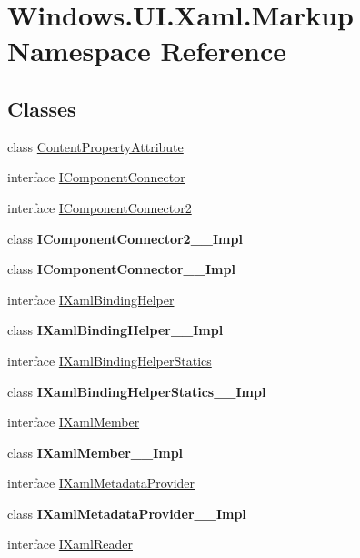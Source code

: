 \hypertarget{namespace_windows_1_1_u_i_1_1_xaml_1_1_markup}{}\section{Windows.\+U\+I.\+Xaml.\+Markup Namespace Reference}
\label{namespace_windows_1_1_u_i_1_1_xaml_1_1_markup}
\subsection*{Classes}
\begin{DoxyCompactItemize}
\item 
class \hyperlink{class_windows_1_1_u_i_1_1_xaml_1_1_markup_1_1_content_property_attribute}{Content\+Property\+Attribute}
\item 
interface \hyperlink{interface_windows_1_1_u_i_1_1_xaml_1_1_markup_1_1_i_component_connector}{I\+Component\+Connector}
\item 
interface \hyperlink{interface_windows_1_1_u_i_1_1_xaml_1_1_markup_1_1_i_component_connector2}{I\+Component\+Connector2}
\item 
class {\bfseries I\+Component\+Connector2\+\_\+\+\_\+\+Impl}
\item 
class {\bfseries I\+Component\+Connector\+\_\+\+\_\+\+Impl}
\item 
interface \hyperlink{interface_windows_1_1_u_i_1_1_xaml_1_1_markup_1_1_i_xaml_binding_helper}{I\+Xaml\+Binding\+Helper}
\item 
class {\bfseries I\+Xaml\+Binding\+Helper\+\_\+\+\_\+\+Impl}
\item 
interface \hyperlink{interface_windows_1_1_u_i_1_1_xaml_1_1_markup_1_1_i_xaml_binding_helper_statics}{I\+Xaml\+Binding\+Helper\+Statics}
\item 
class {\bfseries I\+Xaml\+Binding\+Helper\+Statics\+\_\+\+\_\+\+Impl}
\item 
interface \hyperlink{interface_windows_1_1_u_i_1_1_xaml_1_1_markup_1_1_i_xaml_member}{I\+Xaml\+Member}
\item 
class {\bfseries I\+Xaml\+Member\+\_\+\+\_\+\+Impl}
\item 
interface \hyperlink{interface_windows_1_1_u_i_1_1_xaml_1_1_markup_1_1_i_xaml_metadata_provider}{I\+Xaml\+Metadata\+Provider}
\item 
class {\bfseries I\+Xaml\+Metadata\+Provider\+\_\+\+\_\+\+Impl}
\item 
interface \hyperlink{interface_windows_1_1_u_i_1_1_xaml_1_1_markup_1_1_i_xaml_reader}{I\+Xaml\+Reader}

\end{DoxyCompactItemize}
